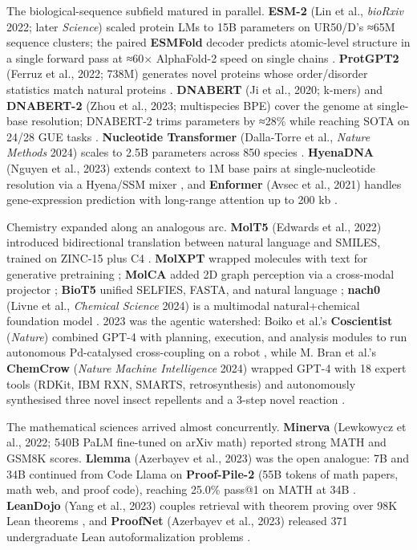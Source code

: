 \documentclass{article}
\begin{document}
The biological-sequence subfield matured in parallel. \textbf{ESM-2} (Lin et al., \emph{bioRxiv} 2022; later \emph{Science}) scaled protein LMs to 15B parameters on UR50/D's ≈65M sequence clusters; the paired \textbf{ESMFold} decoder predicts atomic-level structure in a single forward pass at ≈60× AlphaFold-2 speed on single chains \cite{lin2022evolutionaryscalep}. \textbf{ProtGPT2} (Ferruz et al., 2022; 738M) generates novel proteins whose order/disorder statistics match natural proteins \cite{ferruz2022naturecommunicatio}. \textbf{DNABERT} (Ji et al., 2020; k-mers) and \textbf{DNABERT-2} (Zhou et al., 2023; multispecies BPE) cover the genome at single-base resolution; DNABERT-2 trims parameters by ≈28\% while reaching SOTA on 24/28 GUE tasks \cite{ji2020biorxiv2020,zhou2023arxiv2306150062023}. \textbf{Nucleotide Transformer} (Dalla-Torre et al., \emph{Nature Methods} 2024) scales to 2.5B parameters across 850 species \cite{dallatorre2024nucleotidetransfor}. \textbf{HyenaDNA} (Nguyen et al., 2023) extends context to 1M base pairs at single-nucleotide resolution via a Hyena/SSM mixer \cite{nguyen2023hyenadnalongrangeg}, and \textbf{Enformer} (Avsec et al., 2021) handles gene-expression prediction with long-range attention up to 200 kb \cite{avsec2021effectivegeneexpre}.

Chemistry expanded along an analogous arc. \textbf{MolT5} (Edwards et al., 2022) introduced bidirectional translation between natural language and SMILES, trained on ZINC-15 plus C4 \cite{edwards2022emnlp2022}. \textbf{MolXPT} wrapped molecules with text for generative pretraining \cite{liu2023acl2023}; \textbf{MolCA} added 2D graph perception via a cross-modal projector \cite{liu2023emnlp2023}; \textbf{BioT5} unified SELFIES, FASTA, and natural language \cite{pei2023emnlp2023}; \textbf{nach0} (Livne et al., \emph{Chemical Science} 2024) is a multimodal natural+chemical foundation model \cite{livne2024nach0multimodalnat}. 2023 was the agentic watershed: Boiko et al.'s \textbf{Coscientist} (\emph{Nature}) combined GPT-4 with planning, execution, and analysis modules to run autonomous Pd-catalysed cross-coupling on a robot \cite{boiko2023nature6242023}, while M. Bran et al.'s \textbf{ChemCrow} (\emph{Nature Machine Intelligence} 2024) wrapped GPT-4 with 18 expert tools (RDKit, IBM RXN, SMARTS, retrosynthesis) and autonomously synthesised three novel insect repellents and a 3-step novel reaction \cite{bran2024naturemachineintel}.

The mathematical sciences arrived almost concurrently. \textbf{Minerva} (Lewkowycz et al., 2022; 540B PaLM fine-tuned on arXiv math) reported strong MATH and GSM8K scores. \textbf{Llemma} (Azerbayev et al., 2023) was the open analogue: 7B and 34B continued from Code Llama on \textbf{Proof-Pile-2} (55B tokens of math papers, math web, and proof code), reaching 25.0\% pass@1 on MATH at 34B \cite{azerbayev2023llemmaanopenlangua}. \textbf{LeanDojo} (Yang et al., 2023) couples retrieval with theorem proving over 98K Lean theorems \cite{yang2023leandojotheorempro}, and \textbf{ProofNet} (Azerbayev et al., 2023) released 371 undergraduate Lean autoformalization problems \cite{azerbayev2023arxiv2302124332023}.
\end{document}
